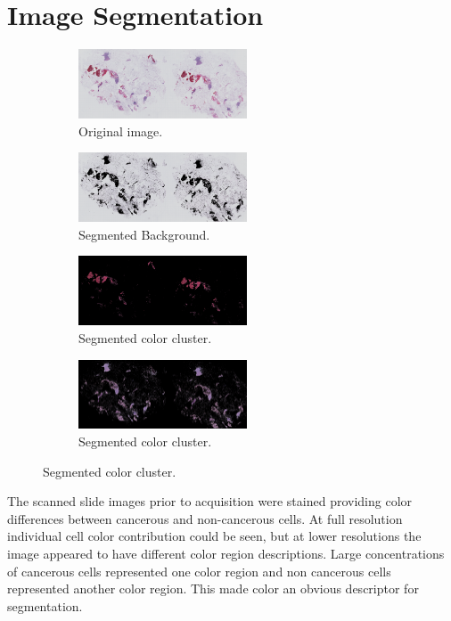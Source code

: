 \documentclass[letterpaper,10pt,oneside]{article}
\begin{document}

\section{Image Segmentation}
\begin{figure}[hbpt]
  \centering
  \begin{subfigure}{5cm}
    \includegraphics[width=5cm]{images/PO13-00516A1_1_7_201305171148_half.png}
    \caption{Original image.}
  \end{subfigure}
  \begin{subfigure}{5cm}
    \includegraphics[width=5cm]{images/PO13-00516A1_1_7_201305171148_cluster_1.png}
    \caption{Segmented Background.}
  \end{subfigure}
  \begin{subfigure}{5cm}
    \includegraphics[width=5cm]{images/PO13-00516A1_1_7_201305171148_cluster_2.png}
    \caption{Segmented color cluster.}
  \end{subfigure}
  \begin{subfigure}{5cm}
    \includegraphics[width=5cm]{images/PO13-00516A1_1_7_201305171148_cluster_3.png}
    \caption{Segmented color cluster.}
  \end{subfigure}
\end{figure}
The scanned slide images prior to acquisition were stained providing color differences between cancerous and non-cancerous cells. At full resolution individual cell color contribution could be seen, but at lower resolutions the image appeared to have different color region descriptions. Large concentrations of cancerous cells represented one color region and non cancerous cells represented another color region. This made color an obvious descriptor for segmentation.
\end{document}
